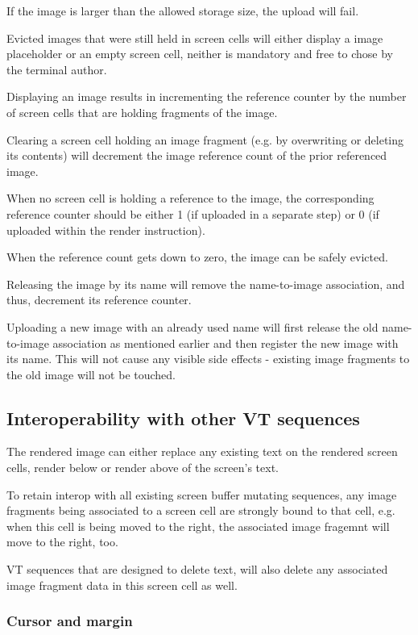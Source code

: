 \documentclass[a4paper]{article}
\begin{document}
If the image is larger than the allowed storage size, the upload will fail.

Evicted images that were still held in screen cells will
either display a image placeholder or an empty screen cell, neither
is mandatory and free to chose by the terminal author.

Displaying an image results in incrementing the reference counter
by the number of screen cells that are holding fragments of the image.

Clearing a screen cell holding an image fragment (e.g. by overwriting
or deleting its contents) will decrement the image reference count of
the prior referenced image.

When no screen cell is holding a reference to the image,
the corresponding reference counter should be either 1 (if uploaded in a separate step)
or 0 (if uploaded within the render instruction).

When the reference count gets down to zero, the image can be safely evicted.

Releasing the image by its name will remove the name-to-image association, and thus,
decrement its reference counter.

Uploading a new image with an already used name will first release the old name-to-image association
as mentioned earlier and then register the new image with its name. This will not cause
any visible side effects - existing image fragments to the old image will not be touched.

\subsection{Interoperability with other VT sequences} %

The rendered image can either replace any existing text on the rendered
screen cells, render below or render above of the screen's text.

To retain interop with all existing screen buffer mutating sequences,
any image fragments being associated to a screen cell are strongly bound
to that cell, e.g. when this cell is being moved to the right, the associated
image fragemnt will move to the right, too.

VT sequences that are designed to delete text, will also delete any
associated image fragment data in this screen cell as well.

\subsubsection*{Cursor and margin}
\end{document}
